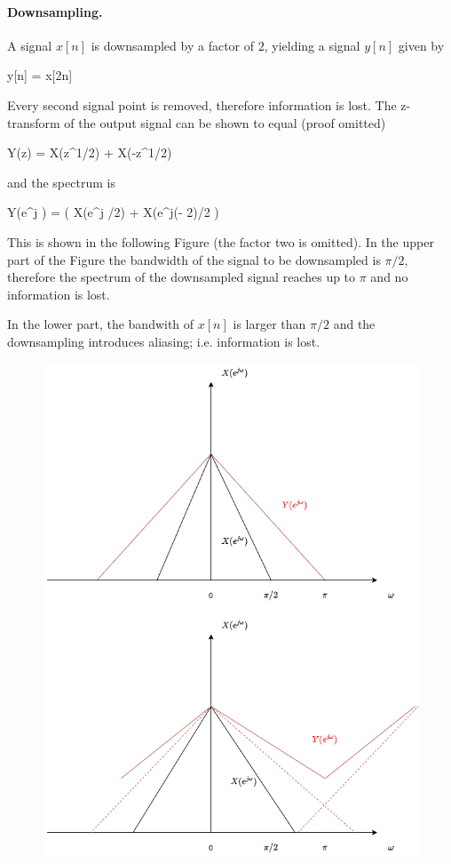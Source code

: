 \paragraph{Downsampling.} A signal $x[n]$ is downsampled by a factor of $2$, yielding a signal $y[n]$ given by

\bee
y[n] = x[2n]
\eee

Every second signal point is removed, therefore information is lost. The z-transform of the output signal can be shown to equal (proof omitted)

\bee
Y(z) =  X(z^{1/2}) +  X(-z^{1/2})
\eee

and the spectrum is

\bee
Y(e^{j \omega}) =  \left( X(e^{j \omega/2}) + X(e^{j(\omega - 2\pi)/2} \right)
\eee

This is shown in the following Figure (the factor two is omitted). In the upper part of the Figure the bandwidth of the signal to be downsampled is $\pi/2$, therefore the spectrum of the downsampled signal reaches up to $\pi$ and no information is lost.

In the lower part, the bandwith of $x[n]$ is larger than $\pi/2$ and the downsampling introduces aliasing; i.e. information is lost.

\begin{figure}[H]
    \centering
    \includegraphics[scale=0.5]{images/2021-11-09-subband_06.png}
\end{figure}




